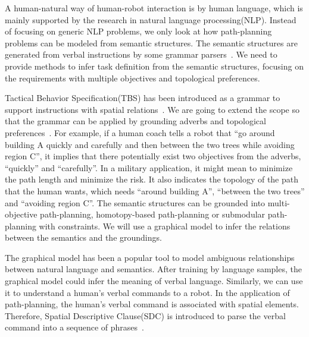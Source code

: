 \documentclass[phd]{byuprop}
\begin{document}
A human-natural way of human-robot interaction is by human language, which is mainly supported by the research in natural language processing(NLP).
Instead of focusing on generic NLP problems, we only look at how path-planning problems can be modeled from semantic structures.
The semantic structures are generated from verbal instructions by some grammar parsers~\cite{Kollar:2010:TUN:1734454.1734553}.
We need to provide methods to infer task definition from the semantic structures, focusing on the requirements with multiple objectives and topological preferences.

Tactical Behavior Specification(TBS) has been introduced as a grammar to support instructions with spatial relations~\cite{Boularias_2015_7953}.
We are going to extend the scope so that the grammar can be applied by grounding adverbs and topological preferences~\cite{Yi2014}.
For example, if a human coach tells a robot that ``go around building A quickly and carefully and then between the two trees while avoiding region C'',
it implies that there potentially exist two objectives from the adverbs, ``quickly'' and ``carefully''.
In a military application, it might mean to minimize the path length and minimize the risk.
It also indicates the topology of the path that the human wants, which needs ``around building A'', ``between the two trees'' and ``avoiding region C''.
The semantic structures can be grounded into multi-objective path-planning, homotopy-based path-planning or submodular path-planning with constraints.
We will use a graphical model to infer the relations between the semantics and the groundings.

The graphical model has been a popular tool to model ambiguous relationships between natural language and semantics.
After training by language samples, the graphical model could infer the meaning of verbal language.
Similarly, we can use it to understand a human's verbal commands to a robot.
In the application of path-planning, the human's verbal command is associated with spatial elements. 
Therefore, Spatial Descriptive Clause(SDC) is introduced to parse the verbal command into a sequence of phrases~\cite{Kollar:2010:TUN:1734454.1734553}.
\end{document}
